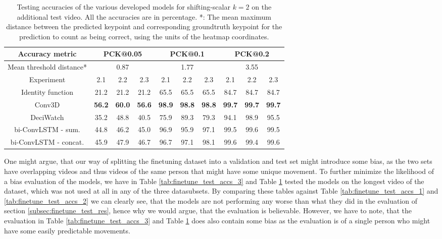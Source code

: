 \documentclass[./main.tex]{subfiles}
\begin{document}
\begin{table}[htbp]
    \begin{tabular}{c||ccc|ccc|ccc}
        \hline
        Accuracy metric & \multicolumn{3}{c}{PCK@0.05} & \multicolumn{3}{c}{PCK@0.1} & \multicolumn{3}{c}{PCK@0.2} \\
        \hline
        Mean threshold distance* & \multicolumn{3}{c}{0.87} & \multicolumn{3}{c}{1.77} & \multicolumn{3}{c}{3.55} \\
        \hline
        Experiment & 2.1 & 2.2 & 2.3 & 2.1 & 2.2 & 2.3 & 2.1 & 2.2 & 2.3 \\
        \hline
        \hline
        Identity function & 21.2 & 21.2 & 21.2 & 65.5 & 65.5 & 65.5 & 84.7 & 84.7 & 84.7 \\
        Conv3D & \textbf{56.2} & \textbf{60.0} & \textbf{56.6} & \textbf{98.9} & \textbf{98.8} & \textbf{98.8} & \textbf{99.7} & \textbf{99.7} & \textbf{99.7} \\
        DeciWatch & 35.2 & 48.8 & 40.5 & 75.9 & 89.3 & 79.3 & 94.1 & 98.9 & 95.5 \\
        bi-ConvLSTM - sum. & 44.8 & 46.2 & 45.0 & 96.9 & 95.9 & 97.1 & 99.5 & 99.6 & 99.5 \\
        bi-ConvLSTM - concat. & 45.9 & 47.9 & 46.7 & 96.7 & 97.1 & 98.1 & 99.6 & 99.4 & 99.6 \\
        \hline
    \end{tabular}
    \caption{Testing accuracies of the various developed models for shifting-scalar $k = 2$ on the additional test video. All the accuracies are in percentage. *: The mean maximum distance between the predicted keypoint and corresponding groundtruth keypoint for the prediction to count as being correct, using the units of the heatmap coordinates.}
    \label{tab:finetune_test_accs_4}
\end{table}

\noindent One might argue, that our way of splitting the finetuning dataset into a validation and test set might introduce some bias, as the two sets have overlapping videos and thus videos of the same person that might have some unique movement. To further minimize the likelihood of a bias evaluation of the models, we have in Table \ref{tab:finetune_test_accs_3} and Table \ref{tab:finetune_test_accs_4} tested the models on the longest video of the dataset, which was not used at all in any of the three datasubsets. By comparing these tables against Table \ref{tab:finetune_test_accs_1} and \ref{tab:finetune_test_accs_2} we can clearly see, that the models are not performing any worse than what they did in the evaluation of section \ref{subsec:finetune_test_res}, hence why we would argue, that the evaluation is believable. However, we have to note, that the evaluation in Table \ref{tab:finetune_test_accs_3} and Table \ref{tab:finetune_test_accs_4} does also contain some bias as the evaluation is of a single person who might have some easily predictable movements.
\end{document}
